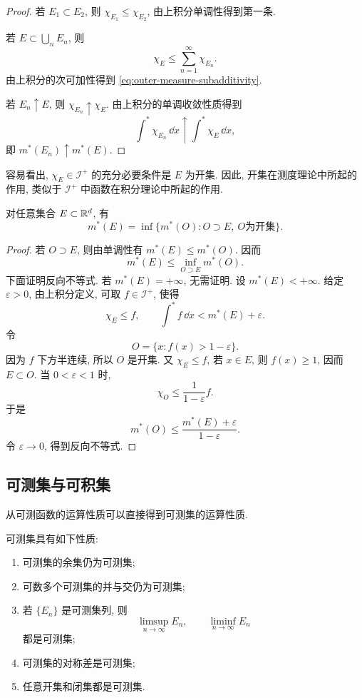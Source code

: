 \begin{proof}
	若 \(E_1\subset E_2\), 则 \(\chi_{E_1}\leq\chi_{E_2}\), 由上积分单调性得到第一条.
	
	若 \(E\subset\bigcup_nE_n\), 则
	\[
	\chi_E\leq \sum_{n=1}^{\infty}\chi_{E_n}.
	\]
	由上积分的次可加性得到 \eqref{eq:outer-measure-subadditivity}.
	
	若 \(E_n\uparrow E\), 则 \(\chi_{E_n}\uparrow\chi_E\). 由上积分的单调收敛性质得到
	\[
	\int^*\chi_{E_n}\,\dd x\uparrow\int^*\chi_E\,\dd x,
	\]
	即 \(m^*(E_n)\uparrow m^*(E)\).
\end{proof}

容易看出, \(\chi_E\in\mathcal I^+\) 的充分必要条件是 \(E\) 为开集. 因此, 开集在测度理论中所起的作用, 类似于 \(\mathcal I^+\) 中函数在积分理论中所起的作用.

\begin{thm}[开集外逼近]
	\label{thm:outer-measure-open-approximation}
	对任意集合 \(E\subset\mathbb{R}^d\), 有
	\begin{equation}
		m^*(E)=\inf\{m^*(O): O\supset E,\ O\text{为开集}\}.
		\label{eq:outer-measure-open-approximation}
	\end{equation}
\end{thm}

\begin{proof}
	若 \(O\supset E\), 则由单调性有 \(m^*(E)\leq m^*(O)\). 因而
	\[
	m^*(E)\leq \inf_{O\supset E}m^*(O).
	\]
	下面证明反向不等式. 若 \(m^*(E)=+\infty\), 无需证明. 设 \(m^*(E)<+\infty\). 给定 \(\varepsilon>0\), 由上积分定义, 可取 \(f\in\mathcal I^+\), 使得
	\[
	\chi_E\leq f,
	\qquad
	\int^* f\,\dd x<m^*(E)+\varepsilon.
	\]
	令
	\[
	O=\{x:f(x)>1-\varepsilon\}.
	\]
	因为 \(f\) 下方半连续, 所以 \(O\) 是开集. 又 \(\chi_E\leq f\), 若 \(x\in E\), 则 \(f(x)\geq1\), 因而 \(E\subset O\). 当 \(0<\varepsilon<1\) 时,
	\[
	\chi_O\leq \frac{1}{1-\varepsilon}f.
	\]
	于是
	\[
	m^*(O)\leq \frac{m^*(E)+\varepsilon}{1-\varepsilon}.
	\]
	令 \(\varepsilon\to0\), 得到反向不等式.
\end{proof}

\subsection{可测集与可积集}

从可测函数的运算性质可以直接得到可测集的运算性质.

\begin{thm}\label{thm:measurable-set-basic-properties}
	可测集具有如下性质:
	\begin{enumerate}
		\item 可测集的余集仍为可测集;
		\item 可数多个可测集的并与交仍为可测集;
		\item 若 \(\{E_n\}\) 是可测集列, 则
		\[
		\limsup_{n\to\infty}E_n,
		\qquad
		\liminf_{n\to\infty}E_n
		\]
		都是可测集;
		\item 可测集的对称差是可测集;
		\item 任意开集和闭集都是可测集.
	\end{enumerate}
\end{thm}

